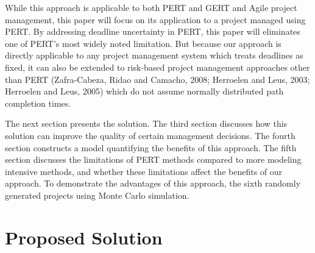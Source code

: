 \documentclass[11pt]{article}
\begin{document}
           While this approach is applicable to both PERT and GERT and Agile project management, this paper will focus on its application to a project managed using PERT.  By addressing deadline uncertainty in PERT, this paper will eliminates one of PERT's most widely noted limitation.   But because our approach is directly applicable to any project management system which treats deadlines as fixed, it can also be extended to risk-based project management approaches other than PERT (Zafra-Cabeza, Ridao and Camacho, 2008; Herroelen and Leus, 2003; Herroelen and Leus, 2005) which do not assume normally distributed path completion times.   
           \par
The next section presents the solution.  The third section discusses how this solution can improve the quality of certain management decisions.  The fourth section constructs a model quantifying the benefits of this approach.  The fifth section discusses the limitations of PERT methods compared to more modeling intensive methods, and whether these limitations affect the benefits of our approach.  To demonstrate the advantages of this approach, the sixth  randomly generated projects using Monte Carlo simulation.
\section{Proposed Solution}
\end{document}
